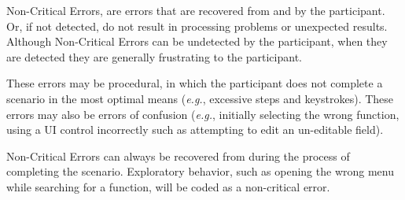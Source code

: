 Non-Critical Errors, are errors that are recovered from and by the participant. Or, if not detected, do not result in processing problems or unexpected results. Although Non-Critical Errors can be undetected by the participant, when they are detected they are generally frustrating to the participant.

These errors may be procedural, in which the participant does not complete a scenario in the most optimal means ({\it e.g.}, excessive steps and keystrokes). These errors may also be errors of confusion ({\it e.g.}, initially selecting the wrong function, using a UI control incorrectly such as attempting to edit an un-editable field).

Non-Critical Errors can always be recovered from during the process of completing the scenario. Exploratory behavior, such as opening the wrong menu while searching for a function, will be coded as a non-critical error.